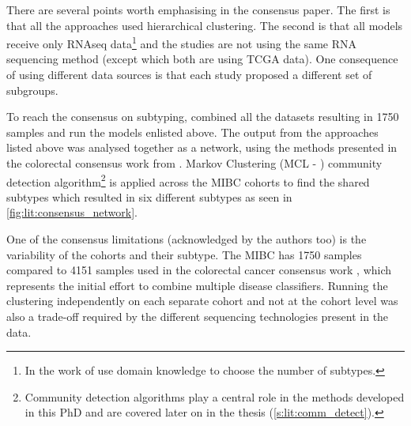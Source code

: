 There are several points worth emphasising in the consensus paper. The first is that all the approaches\cite{Mo2018-rl, Damrauer2014-tc, Choi2014-ed, Marzouka2018-ge, Rebouissou2014-ep,Robertson2017-mg}  used hierarchical clustering. The second is that all models receive only RNAseq data\footnote{In the work of \citet{Robertson2017-mg} use domain knowledge to choose the number of subtypes.} and the studies are not using the same RNA sequencing method (except \cite{Robertson2017-mg, Mo2018-rl} which both are using TCGA data). One consequence of using different data sources is that each study proposed a different set of subgroups. 

To reach the consensus on subtyping, \citet{Kamoun2020-tj} combined all the datasets resulting in 1750 samples and run the models enlisted above. The output from the approaches listed above was analysed together as a network, using the methods presented in the colorectal consensus work from \citet{Guinney2015-fy}. Markov Clustering (MCL - \citet{Van_Dongen2008-yj}) community detection algorithm\footnote{Community detection algorithms play a central role in the methods developed in this PhD and are covered later on in the thesis (\cref{s:lit:comm_detect}).} is applied  across the MIBC cohorts to find the shared subtypes which resulted in six different subtypes as seen in \cref{fig:lit:consensus_network}. 


One of the consensus limitations (acknowledged by the authors too) is the variability of the cohorts and their subtype. The MIBC has 1750 samples compared to 4151 samples used in the colorectal cancer consensus work \cite{Guinney2015-fy}, which represents the initial effort to combine multiple disease classifiers. Running the clustering independently on each separate cohort and not at the cohort level was also a trade-off required by the different sequencing technologies present in the data. 

